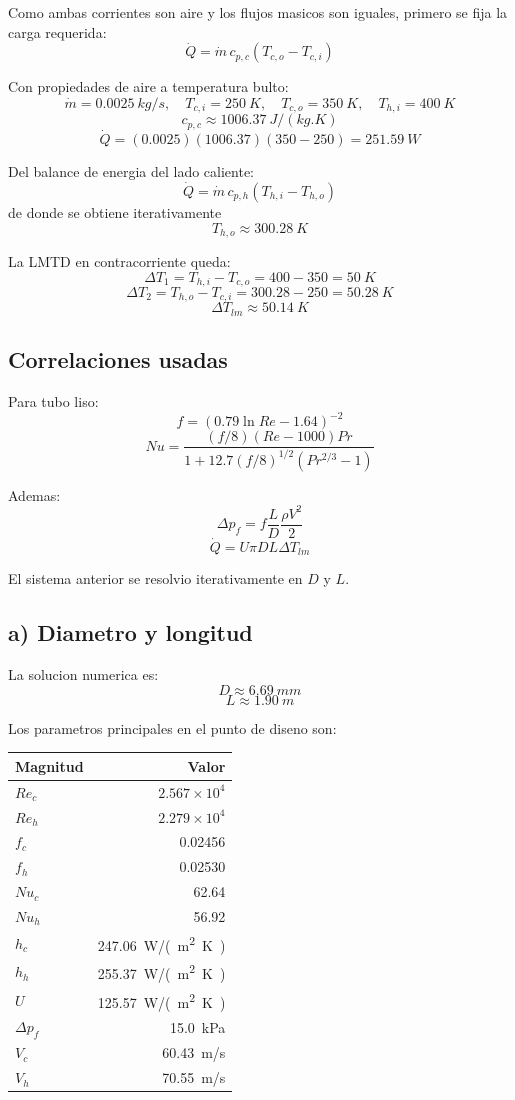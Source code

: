 \documentclass[11pt]{article}
\begin{document}
Como ambas corrientes son aire y los flujos masicos son iguales, primero se fija la carga requerida:
\[
\dot Q=\dot m\,c_{p,c}(T_{c,o}-T_{c,i})
\]

Con propiedades de aire a temperatura bulto:
\[
\dot m=\SI{0.0025}{kg/s}, \quad
T_{c,i}=\SI{250}{K}, \quad
T_{c,o}=\SI{350}{K}, \quad
T_{h,i}=\SI{400}{K}
\]
\[
c_{p,c}\approx \SI{1006.37}{J/(kg.K)}
\]
\[
\dot Q=(0.0025)(1006.37)(350-250)=\SI{251.59}{W}
\]

Del balance de energia del lado caliente:
\[
\dot Q=\dot m\,c_{p,h}(T_{h,i}-T_{h,o})
\]
de donde se obtiene iterativamente
\[
T_{h,o}\approx \SI{300.28}{K}
\]

La LMTD en contracorriente queda:
\[
\Delta T_1=T_{h,i}-T_{c,o}=400-350=\SI{50}{K}
\]
\[
\Delta T_2=T_{h,o}-T_{c,i}=300.28-250=\SI{50.28}{K}
\]
\[
\Delta T_{lm}\approx \SI{50.14}{K}
\]

\subsection*{Correlaciones usadas}

Para tubo liso:
\[
f=\left(0.79\ln Re -1.64\right)^{-2}
\]
\[
Nu=\frac{(f/8)(Re-1000)Pr}{1+12.7(f/8)^{1/2}(Pr^{2/3}-1)}
\]

Ademas:
\[
\Delta p_f=f\frac{L}{D}\frac{\rho V^2}{2}
\]
\[
\dot Q=U\pi D L \Delta T_{lm}
\]

El sistema anterior se resolvio iterativamente en \(D\) y \(L\).

\subsection*{a) Diametro y longitud}

La solucion numerica es:
\[
\boxed{D \approx \SI{6.69}{mm}}
\]
\[
\boxed{L \approx \SI{1.90}{m}}
\]

Los parametros principales en el punto de diseno son:

\begin{center}
\begin{tabular}{lr}
\toprule
Magnitud & Valor \\
\midrule
\(Re_c\) & \(2.567\times 10^4\) \\
\(Re_h\) & \(2.279\times 10^4\) \\
\(f_c\) & 0.02456 \\
\(f_h\) & 0.02530 \\
\(Nu_c\) & 62.64 \\
\(Nu_h\) & 56.92 \\
\(h_c\) & \SI{247.06}{W/(m^2.K)} \\
\(h_h\) & \SI{255.37}{W/(m^2.K)} \\
\(U\) & \SI{125.57}{W/(m^2.K)} \\
\(\Delta p_f\) & \SI{15.0}{kPa} \\
\(V_c\) & \SI{60.43}{m/s} \\
\(V_h\) & \SI{70.55}{m/s} \\
\bottomrule
\end{tabular}
\end{center}
\end{document}
